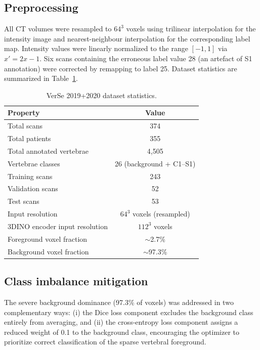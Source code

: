 \documentclass[preprint,12pt,3p]{elsarticle}
\begin{document}
\subsection{Preprocessing}
All CT volumes were resampled to $64^3$ voxels using trilinear interpolation for the intensity image and nearest-neighbour interpolation for the corresponding label map. Intensity values were linearly normalized to the range $[-1, 1]$ via $x' = 2x - 1$. Six scans containing the erroneous label value 28 (an artefact of S1 annotation) were corrected by remapping to label 25. Dataset statistics are summarized in Table~\ref{tab:dataset}.

\begin{table}[h]
\centering
\caption{VerSe 2019+2020 dataset statistics.}
\label{tab:dataset}
\small
\begin{tabular}{lc}
\toprule
\textbf{Property} & \textbf{Value} \\
\midrule
Total scans & 374 \\
Total patients & 355 \\
Total annotated vertebrae & 4{,}505 \\
Vertebrae classes & 26 (background + C1--S1) \\
Training scans & 243 \\
Validation scans & 52 \\
Test scans & 53 \\
Input resolution & $64^3$ voxels (resampled) \\
3DINO encoder input resolution & $112^3$ voxels \\
Foreground voxel fraction & $\sim$2.7\% \\
Background voxel fraction & $\sim$97.3\% \\
\bottomrule
\end{tabular}
\end{table}

\subsection{Class imbalance mitigation}
The severe background dominance (97.3\% of voxels) was addressed in two complementary ways: (i) the Dice loss component excludes the background class entirely from averaging, and (ii) the cross-entropy loss component assigns a reduced weight of 0.1 to the background class, encouraging the optimizer to prioritize correct classification of the sparse vertebral foreground.

\end{document}
